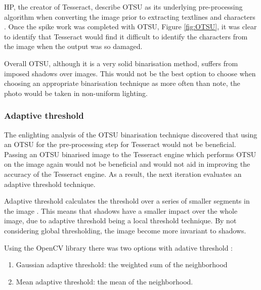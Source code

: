 HP, the creator of Tesseract, describe OTSU as its underlying pre-processing algorithm when converting the image prior to extracting textlines and characters \cite{citeulike:13931186}. Once the spike work was completed with OTSU, Figure \ref{fig:OTSU}, it was clear to identify that Tesseract would find it difficult to identify the characters from the image when the output was so damaged.

Overall OTSU, although it is a very solid binarisation method, suffers from imposed shadows over images. This would not be the best option to choose when choosing an appropriate binarisation technique as more often than note, the photo would be taken in non-uniform lighting.

\subsubsection{Adaptive threshold} \label{section:threshold}
The enlighting analysis of the OTSU binarisation technique discovered that using an OTSU for the pre-processing step for Tesseract would not be beneficial. Passing an OTSU binarised image to the Tesseract engine which performs OTSU on the image again would not be beneficial and would not aid in improving the accuracy of the Tesseract engine. As a result, the next iteration evaluates an adaptive threshold technique.

Adaptive threshold calculates the threshold over a series of smaller segments in the image \cite{citeulike:14021401}. This means that shadows have a smaller impact over the whole image, due to adaptive threshold being a local threshold technique. By not considering global thresholding, the image become more invariant to shadows.

Using the OpenCV library there was two options with adative threshold \cite{citeulike:1402140}:
\begin{enumerate}
  \item Gaussian adaptive threshold: the weighted sum of the neighborhood
  \item Mean adaptive threshold: the mean of the neighborhood.
\end{enumerate}

